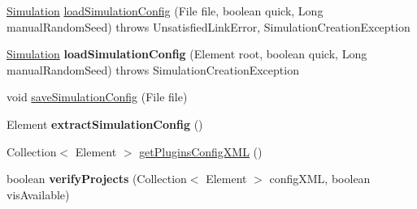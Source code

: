 \begin{DoxyCompactItemize}
\item 
\hyperlink{classorg_1_1contikios_1_1cooja_1_1Simulation}{Simulation} \hyperlink{classorg_1_1contikios_1_1cooja_1_1Cooja_ac87c4fac26f6b5eb1d543857ca18d215}{load\-Simulation\-Config} (File file, boolean quick, Long manual\-Random\-Seed)  throws Unsatisfied\-Link\-Error, Simulation\-Creation\-Exception 
\item 
\hypertarget{classorg_1_1contikios_1_1cooja_1_1Cooja_a70cede41ba92811c2336a9952a7ec1c6}{\hyperlink{classorg_1_1contikios_1_1cooja_1_1Simulation}{Simulation} {\bfseries load\-Simulation\-Config} (Element root, boolean quick, Long manual\-Random\-Seed)  throws Simulation\-Creation\-Exception }\label{classorg_1_1contikios_1_1cooja_1_1Cooja_a70cede41ba92811c2336a9952a7ec1c6}

\item 
void \hyperlink{classorg_1_1contikios_1_1cooja_1_1Cooja_a480207a242c810a72524f25acc5333e4}{save\-Simulation\-Config} (File file)
\item 
\hypertarget{classorg_1_1contikios_1_1cooja_1_1Cooja_ac2479bd3e4a3d97f258a46bfb6c2d1f5}{Element {\bfseries extract\-Simulation\-Config} ()}\label{classorg_1_1contikios_1_1cooja_1_1Cooja_ac2479bd3e4a3d97f258a46bfb6c2d1f5}

\item 
Collection$<$ Element $>$ \hyperlink{classorg_1_1contikios_1_1cooja_1_1Cooja_a3700736fe7a56c54607848faade960b7}{get\-Plugins\-Config\-X\-M\-L} ()
\item 
\hypertarget{classorg_1_1contikios_1_1cooja_1_1Cooja_ab884045b7099fca29fa6f15a7a18c534}{boolean {\bfseries verify\-Projects} (Collection$<$ Element $>$ config\-X\-M\-L, boolean vis\-Available)}\label{classorg_1_1contikios_1_1cooja_1_1Cooja_ab884045b7099fca29fa6f15a7a18c534}


\end{DoxyCompactItemize}
